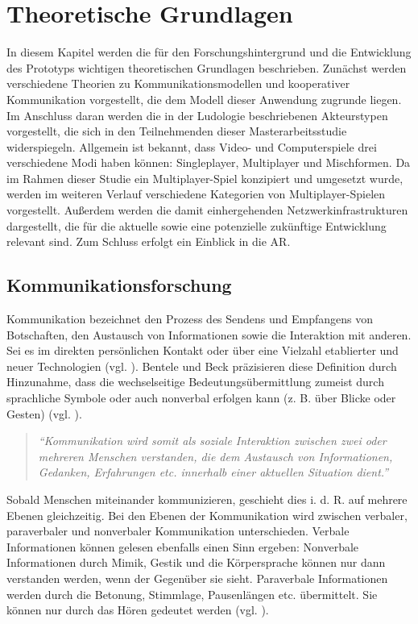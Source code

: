 \chapter{Theoretische Grundlagen}\label{sec:basics}

In diesem Kapitel werden die für den Forschungshintergrund und die Entwicklung des Prototyps wichtigen theoretischen Grundlagen beschrieben.
Zunächst werden verschiedene Theorien zu Kommunikationsmodellen und kooperativer Kommunikation vorgestellt, die dem Modell dieser Anwendung zugrunde liegen.
Im Anschluss daran werden die in der Ludologie beschriebenen Akteurstypen vorgestellt, die sich in den Teilnehmenden dieser Masterarbeitsstudie widerspiegeln.
Allgemein ist bekannt, dass Video- und Computerspiele drei verschiedene Modi haben können: Singleplayer, Multiplayer und Mischformen. Da im Rahmen dieser Studie ein Multiplayer-Spiel konzipiert und umgesetzt wurde, werden im weiteren Verlauf verschiedene Kategorien von Multiplayer-Spielen vorgestellt. Außerdem werden die damit einhergehenden Netzwerkinfrastrukturen dargestellt, die für die aktuelle sowie eine potenzielle zukünftige Entwicklung relevant sind. Zum Schluss erfolgt ein Einblick in die \ac{AR}.

\section{Kommunikationsforschung}
Kommunikation bezeichnet den Prozess des Sendens und Empfangens von Botschaften, den Austausch von Informationen sowie die Interaktion mit anderen. Sei es im direkten persönlichen Kontakt oder über eine Vielzahl etablierter und neuer Technologien (vgl. \cite[S. 18]{krcmar_communication_2016}).
Bentele und Beck präzisieren diese Definition durch Hinzunahme, dass die wechselseitige Bedeutungsübermittlung zumeist durch sprachliche Symbole oder auch nonverbal erfolgen kann (z. B. über Blicke oder Gesten) (vgl. \cite[S. 20]{bentele_information_1994}).

\begin{quote}
\textit{\enquote{Kommunikation wird somit als soziale Interaktion zwischen zwei oder mehreren Menschen verstanden, die dem Austausch von Informationen, Gedanken, Erfahrungen etc. innerhalb einer aktuellen Situation dient.}} \cite[S. 19]{becker_praxishandbuch_2018}
\end{quote}

Sobald Menschen miteinander kommunizieren, geschieht dies i. d. R. auf mehrere Ebenen gleichzeitig. Bei den Ebenen der Kommunikation wird zwischen verbaler, paraverbaler und nonverbaler Kommunikation unterschieden. Verbale Informationen können gelesen ebenfalls einen Sinn ergeben: Nonverbale Informationen durch Mimik, Gestik und die Körpersprache können nur dann verstanden werden, wenn der Gegenüber sie sieht. Paraverbale Informationen werden durch die Betonung, Stimmlage, Pausenlängen etc. übermittelt. Sie können nur durch das Hören gedeutet werden (vgl. \cite[S. 33]{ebert_formen_2018}).

